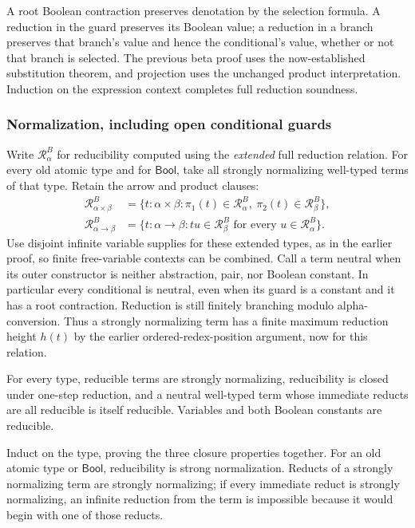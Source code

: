 A root Boolean contraction preserves denotation by the selection
formula. A reduction in the guard preserves its Boolean value; a
reduction in a branch preserves that branch's value and hence the
conditional's value, whether or not that branch is selected. The
previous beta proof uses the now-established substitution theorem,
and projection uses the unchanged product interpretation. Induction
on the expression context completes full reduction soundness.
\Done

\subsubsection{Normalization, including open conditional guards}
Write $\mathcal R^B_\alpha$ for reducibility computed using the
\emph{extended} full reduction relation. For every old atomic type
and for $\mathsf{Bool}$, take all strongly normalizing well-typed
terms of that type. Retain the arrow and product clauses:
\[
\begin{aligned}
\mathcal R^B_{\alpha\times\beta}
 &=\{t:\alpha\times\beta:
       \pi_1(t)\in\mathcal R^B_\alpha,
       \ \pi_2(t)\in\mathcal R^B_\beta\},\\
\mathcal R^B_{\alpha\to\beta}
 &=\{t:\alpha\to\beta:
       tu\in\mathcal R^B_\beta\text{ for every }
       u\in\mathcal R^B_\alpha\}.
\end{aligned}
\]
Use disjoint infinite variable supplies for these extended types, as in
the earlier proof, so finite free-variable contexts can be combined.
Call a term neutral when its outer constructor is neither abstraction,
pair, nor Boolean constant. In particular every conditional is neutral,
even when its guard is a constant and it has a root contraction.
Reduction is still finitely branching modulo alpha-conversion. Thus a
strongly normalizing term has a finite maximum reduction height $h(t)$
by the earlier ordered-redex-position argument, now for this relation.

\begin{lemma}
For every type, reducible terms are strongly normalizing, reducibility
is closed under one-step reduction, and a neutral well-typed term
whose immediate reducts are all reducible is itself reducible.
Variables and both Boolean constants are reducible.
\end{lemma}
\Proof
Induct on the type, proving the three closure properties together.
For an old atomic type or $\mathsf{Bool}$, reducibility is strong
normalization. Reducts of a strongly normalizing term are strongly
normalizing; if every immediate reduct is strongly normalizing, an
infinite reduction from the term is impossible because it would begin
with one of those reducts.

